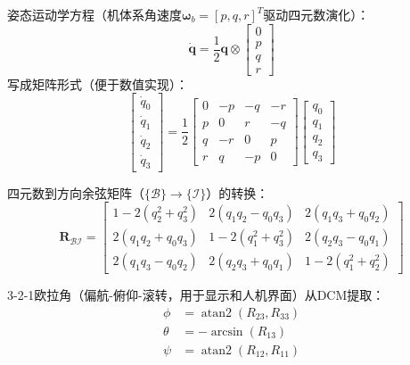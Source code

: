 姿态运动学方程（机体系角速度$\bm{\omega}_b = [p, q, r]^T$驱动四元数演化）：
\begin{equation}
    \dot{\bm{q}} = \frac{1}{2} \bm{q} \otimes
    \begin{bmatrix} 0 \\ p \\ q \\ r \end{bmatrix}
    \label{eq:quaternion_kinematics}
\end{equation}
写成矩阵形式（便于数值实现）：
\begin{equation}
    \begin{bmatrix} \dot{q}_0 \\ \dot{q}_1 \\ \dot{q}_2 \\ \dot{q}_3 \end{bmatrix}
    = \frac{1}{2}
    \begin{bmatrix}
        0 & -p & -q & -r \\
        p &  0 &  r & -q \\
        q & -r &  0 &  p \\
        r &  q & -p &  0
    \end{bmatrix}
    \begin{bmatrix} q_0 \\ q_1 \\ q_2 \\ q_3 \end{bmatrix}
    \label{eq:quaternion_matrix}
\end{equation}

四元数到方向余弦矩阵（$\{\mathcal{B}\}\to\{\mathcal{I}\}$）的转换：
\begin{equation}
    \bm{R}_{\mathcal{B}\mathcal{I}} =
    \begin{bmatrix}
        1-2(q_2^2+q_3^2) & 2(q_1 q_2 - q_0 q_3) & 2(q_1 q_3 + q_0 q_2) \\
        2(q_1 q_2 + q_0 q_3) & 1-2(q_1^2+q_3^2) & 2(q_2 q_3 - q_0 q_1) \\
        2(q_1 q_3 - q_0 q_2) & 2(q_2 q_3 + q_0 q_1) & 1-2(q_1^2+q_2^2)
    \end{bmatrix}
    \label{eq:dcm_from_quaternion}
\end{equation}

3-2-1欧拉角（偏航-俯仰-滚转，用于显示和人机界面）从DCM提取：
\begin{equation}
    \begin{aligned}
        \phi &= \operatorname{atan2}(R_{23}, R_{33}) \\
        \theta &= -\arcsin(R_{13}) \\
        \psi &= \operatorname{atan2}(R_{12}, R_{11})
    \end{aligned}
    \label{eq:euler_from_dcm}
\end{equation}

